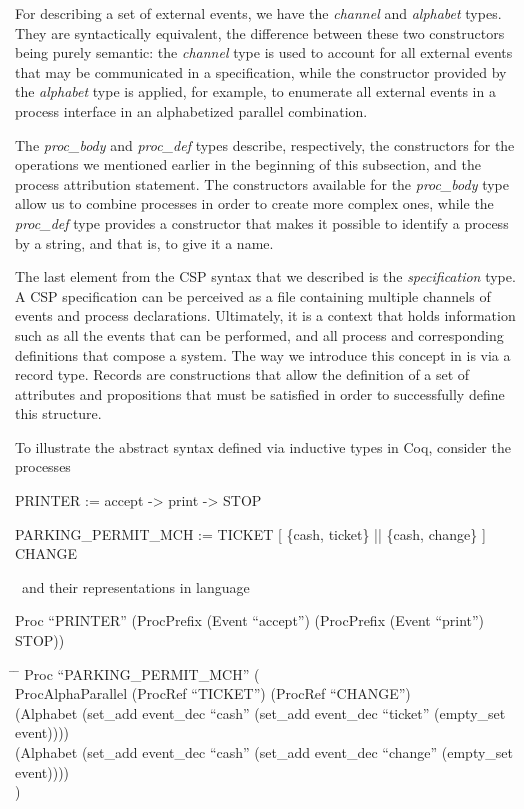 For describing a set of external events, we have the \emph{channel} and \emph{alphabet} types. They are syntactically equivalent, the difference between these two constructors being purely semantic: the \emph{channel} type is used to account for all external events that may be communicated in a \CSPcoq{} specification, while the constructor provided by the \emph{alphabet} type is applied, for example, to enumerate all external events in a process interface in an alphabetized parallel combination.

The \emph{proc\_body} and \emph{proc\_def} types describe, respectively, the constructors for the operations we mentioned earlier in the beginning of this subsection, and the process attribution statement. The constructors available for the \emph{proc\_body} type allow us to combine processes in order to create more complex ones, while the \emph{proc\_def} type provides a constructor that makes it possible to identify a process by a string, and that is, to give it a name.

The last element from the CSP syntax that we described is the \emph{specification} type. A CSP specification can be perceived as a file containing multiple channels of events and process declarations. Ultimately, it is a context that holds information such as all the events that can be performed, and all process and corresponding definitions that compose a system. The way we introduce this concept in \CSPcoq{} is via a record type. Records are constructions that allow the definition of a set of attributes and propositions that must be satisfied in order to successfully define this structure.

To illustrate the abstract syntax defined via inductive types in Coq, consider the \CSPM{} processes
\
\begin{flushleft}
	PRINTER := accept -> print -> STOP

	PARKING\_PERMIT\_MCH := TICKET [ \{cash, ticket\} || \{cash, change\} ] CHANGE
\end{flushleft}
\
and their representations in \CSPcoq{} language

\begin{flushleft}
	Proc ``PRINTER'' (ProcPrefix (Event ``accept'') (ProcPrefix (Event ``print'') STOP))
\end{flushleft}

\begin{tabbing}
	\hspace*{1em}\= \hspace*{2em} \= \kill
	Proc ``PARKING\_PERMIT\_MCH'' (\\
	\>	ProcAlphaParallel (ProcRef ``TICKET'') (ProcRef ``CHANGE'')\\
	\>	(Alphabet (set\_add event\_dec ``cash'' (set\_add event\_dec ``ticket'' (empty\_set event))))\\
	\>	(Alphabet (set\_add event\_dec ``cash'' (set\_add event\_dec ``change'' (empty\_set event))))\\
	)
\end{tabbing}

